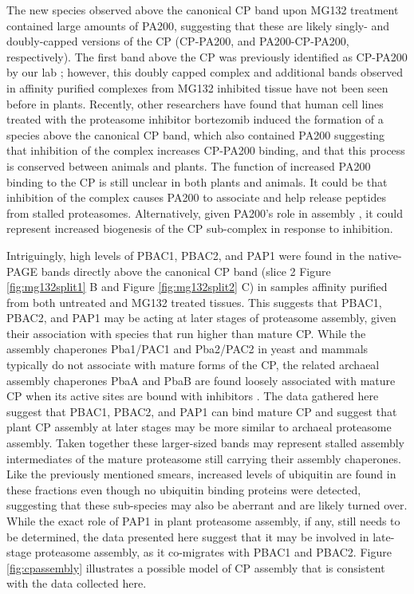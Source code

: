 	The new species observed above the canonical CP band upon MG132 treatment contained large amounts of PA200, suggesting that these are likely singly- and doubly-capped versions of the CP (CP-PA200, and PA200-CP-PA200, respectively). The first band above the CP was previously identified as CP-PA200 by our lab \citep{book10}; however, this doubly capped complex and additional bands observed in affinity purified complexes from MG132 inhibited tissue have not been seen before in plants. Recently, other researchers have found that human cell lines treated with the proteasome inhibitor bortezomib induced the formation of a species above the canonical CP band, which also contained PA200 \citep{welk16} suggesting that inhibition of the complex increases CP-PA200 binding, and that this process is conserved between animals and plants. The function of increased PA200 binding to the CP is still unclear in both plants and animals. It could be that inhibition of the complex causes PA200 to associate and help release peptides from stalled proteasomes. Alternatively, given PA200's role in assembly \citep{savulescu11}, it could represent increased biogenesis of the CP sub-complex in response to inhibition.
	
Intriguingly, high levels of PBAC1, PBAC2, and PAP1 were found in the native-PAGE bands directly above the canonical CP band (slice 2 Figure \ref{fig:mg132split1} B and Figure \ref{fig:mg132split2} C) in samples affinity purified from both untreated and MG132 treated tissues. This suggests that PBAC1, PBAC2, and PAP1 may be acting at later stages of proteasome assembly, given their association with species that run higher than mature CP. While the assembly chaperones Pba1/PAC1 and Pba2/PAC2 in yeast and mammals typically do not associate with mature forms of the CP, the related archaeal assembly chaperones PbaA and PbaB are found loosely associated with mature CP when its active sites are bound with inhibitors \citep{kusmierczyk11}. The data gathered here suggest that PBAC1, PBAC2, and PAP1 can bind mature CP and suggest that plant CP assembly at later stages may be more similar to archaeal proteasome assembly. Taken together these larger-sized bands may represent stalled assembly intermediates of the mature proteasome still carrying their assembly chaperones. Like the previously mentioned smears, increased levels of ubiquitin are found in these fractions even though no ubiquitin binding proteins were detected, suggesting that these sub-species may also be aberrant and are likely turned over. While the exact role of PAP1 in plant proteasome assembly, if any, still needs to be determined, the data presented here suggest that it may be involved in late-stage proteasome assembly, as it co-migrates with PBAC1 and PBAC2. Figure \ref{fig:cpassembly} illustrates a possible model of CP assembly that is consistent with the data collected here. 

